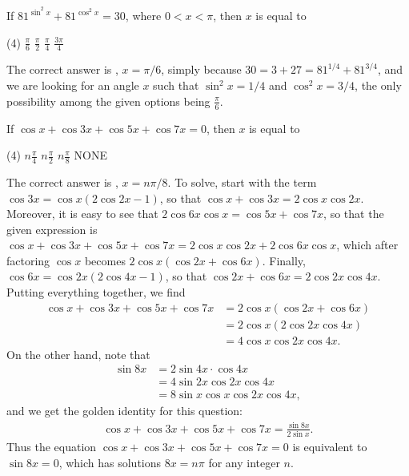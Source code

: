 \begin{question}[name=2004 Karnataka CET]
    If $81^{\sin^2 x} + 81^{\cos^2 x}=30$, where $0<x<\pi$, then $x$ is equal to
    \begin{tasks}(4)
        \task \correct $\displaystyle \frac{\pi}{6}$
        \task $\displaystyle \frac{\pi}{2}$
        \task $\displaystyle \frac{\pi}{4}$
        \task $\displaystyle \frac{3\pi}{4}$
    \end{tasks}
\end{question}
\begin{solution}
    The correct answer is \correct, $x=\pi/6$, simply because $30=3+27 = 81^{1/4} + 81^{3/4}$, and we are looking for an angle $x$ such that $\sin^2 x = 1/4$ and $\cos^2 x = 3/4$, the only possibility among the given options being $\displaystyle \frac{\pi}{6}$.
\end{solution}


\begin{question}
    If $\cos x + \cos 3x + \cos 5x + \cos 7x = 0$, then $x$ is equal to
    \begin{tasks}(4)
        \task $\displaystyle n\frac{\pi}{4}$
        \task $\displaystyle n\frac{\pi}{2}$
        \task \correct $\displaystyle n\frac{\pi}{8}$
        \task NONE
    \end{tasks}
\end{question}
\begin{solution}
    The correct answer is \correct, $x=n\pi/8$. To solve, start with the term $\cos 3x = \cos x (2\cos 2x-1)$, so that $\cos x + \cos 3x = 2 \cos x \cos 2x$. Moreover, 
    it is easy to see that $2 \cos 6x \cos x= \cos 5x+ \cos 7x$, so that the given expression is $\cos x + \cos 3x + \cos 5x + \cos 7x = 2 \cos x \cos 2x + 2 \cos 6x \cos x$, which after factoring $\cos x$ becomes $2\cos x(\cos 2x + \cos 6x)$. Finally, $\cos 6x = \cos 2x (2\cos 4x-1)$, so that $\cos 2x + \cos 6x = 2 \cos 2x \cos 4x$. Putting everything together, we find
    \begin{align*}
        \cos x + \cos 3x + \cos 5x + \cos 7x &= 2\cos x(\cos 2x + \cos 6x)\\
        &= 2\cos x(2 \cos 2x \cos 4x)\\
        &= 4 \cos x \cos 2x \cos 4x.
    \end{align*}
    On the other hand, note that
    \begin{align*}
        \sin 8x &= 2 \sin 4x \cdot \cos 4x\\
                &= 4 \sin 2x \cos 2x \cos 4x \\
                &= 8\sin x \cos x \cos 2x \cos 4x,
    \end{align*}
    and we get the golden identity for this question:
    \begin{align*}
        \cos x + \cos 3x + \cos 5x + \cos 7x = \frac{\sin 8x}{2\sin x}.
    \end{align*}
    Thus the equation $\cos x + \cos 3x + \cos 5x + \cos 7x = 0$ is equivalent to $\sin 8x = 0$, which has solutions $8x = n\pi$ for any integer $n$.
\end{solution}



